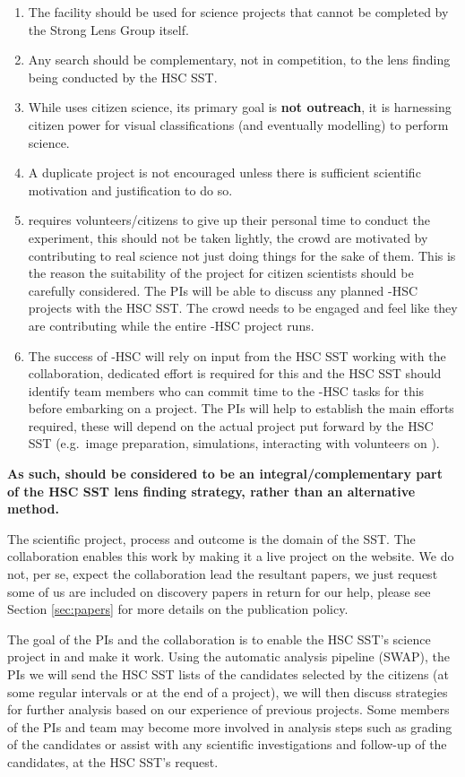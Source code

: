 \documentclass[a4paper,twocolumn]{article}
\begin{document}
\begin{enumerate}
\item The \SW facility should be used for science projects that cannot be completed by the Strong Lens Group itself. 
\item Any \SW search should be complementary, not in competition, to the lens finding being conducted by the HSC SST.
\item While \SW uses citizen science, its primary goal is \textbf{not outreach}, it is harnessing citizen power for visual classifications (and eventually modelling) to perform science.
\item A duplicate project is not encouraged unless there is sufficient scientific motivation and justification to do so.
\item \SW requires volunteers/citizens to give up their personal time to conduct the experiment, this should not be taken lightly, the crowd are motivated by contributing to real science not just doing things for the sake of them. This is the reason the suitability of the project for citizen scientists should be carefully considered. The \SW PIs will be able to discuss any planned \SW-HSC projects with the HSC SST. The crowd needs to be engaged and feel like they are contributing while the entire \SW-HSC project runs.
\item The success of \SW-HSC will rely on input from the HSC SST working with the \SW collaboration, dedicated effort is required for this and the HSC SST should identify team members who can commit time to the \SW-HSC tasks for this before embarking on a project. The \SW PIs will help to establish the main efforts required, these will depend on the actual project put forward by the HSC SST (e.g.\ image preparation, simulations, interacting with volunteers on \Talk).
\end{enumerate}

\textbf{As such, \SW should be considered to be an integral/complementary part of the HSC SST lens finding strategy, rather than an alternative method.}

The scientific project, process and outcome is the domain of the
SST. The \SW collaboration enables this work by making it a live
project on the website. We do not, per se, expect the \SW
collaboration lead the resultant papers, we just request some of us
are included on discovery papers in return for our help, please see
Section \ref{sec:papers} for more details on the publication policy.

The goal of the \SW PIs and the \SW collaboration is to enable the
HSC SST's science project in \sw and make it work. Using the
automatic analysis pipeline (SWAP), the \SW PIs we will send the HSC
SST lists of the candidates selected by the citizens (at some regular
intervals or at the end of a project), we will then discuss strategies
for further analysis based on our experience of previous
projects. Some members of the \SW PIs and team may become more
involved in analysis steps such as grading of the \sw candidates or
assist with any scientific investigations and follow-up of the
candidates, at the HSC SST's request.
\end{document}
